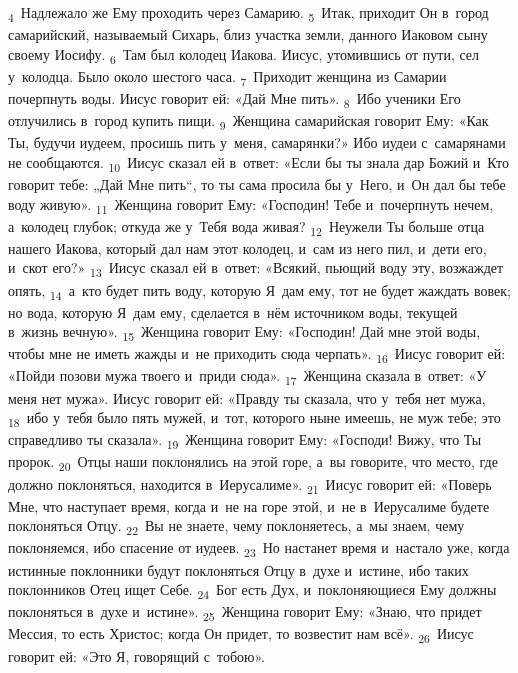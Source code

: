 \documentclass[a4paper,12pt]{article}
\begin{document}
\textsubscript{4}~Надлежало же Ему проходить через Самарию.
\textsubscript{5}~Итак, приходит Он в~город самарийский, называемый Сихарь, близ участка земли, данного Иаковом сыну своему Иосифу.
\textsubscript{6}~Там был колодец Иакова. Иисус, утомившись от пути, сел у~колодца. Было около шестого часа.
\textsubscript{7}~Приходит женщина из Самарии почерпнуть воды. Иисус говорит ей: «Дай Мне пить».
\textsubscript{8}~Ибо ученики Его отлучились в~город купить пищи.
\textsubscript{9}~Женщина самарийская говорит Ему: «Как Ты, будучи иудеем, просишь пить у~меня, самарянки?» Ибо иудеи с~самарянами не сообщаются.
\textsubscript{10}~Иисус сказал ей в~ответ: «Если бы ты знала дар Божий и~Кто говорит тебе: „Дай Мне пить“, то ты сама просила бы у~Него, и~Он дал бы тебе воду живую».
\textsubscript{11}~Женщина говорит Ему: «Господин! Тебе и~почерпнуть нечем, а~колодец глубок; откуда же у~Тебя вода живая?
\textsubscript{12}~Неужели Ты больше отца нашего Иакова, который дал нам этот колодец, и~сам из него пил, и~дети его, и~скот его?»
\textsubscript{13}~Иисус сказал ей в~ответ: «Всякий, пьющий воду эту, возжаждет опять,
\textsubscript{14}~а~кто будет пить воду, которую Я~дам ему, тот не будет жаждать вовек; но вода, которую Я~дам ему, сделается в~нём источником воды, текущей в~жизнь вечную».
\textsubscript{15}~Женщина говорит Ему: «Господин! Дай мне этой воды, чтобы мне не иметь жажды и~не приходить сюда черпать».
\textsubscript{16}~Иисус говорит ей: «Пойди позови мужа твоего и~приди сюда».
\textsubscript{17}~Женщина сказала в~ответ: «У меня нет мужа». Иисус говорит ей: «Правду ты сказала, что у~тебя нет мужа,
\textsubscript{18}~ибо у~тебя было пять мужей, и~тот, которого ныне имеешь, не муж тебе; это справедливо ты сказала».
\textsubscript{19}~Женщина говорит Ему: «Господи! Вижу, что Ты пророк.
\textsubscript{20}~Отцы наши поклонялись на этой горе, а~вы говорите, что место, где должно поклоняться, находится в~Иерусалиме».
\textsubscript{21}~Иисус говорит ей: «Поверь Мне, что наступает время, когда и~не на горе этой, и~не в~Иерусалиме будете поклоняться Отцу.
\textsubscript{22}~Вы не знаете, чему поклоняетесь, а~мы знаем, чему поклоняемся, ибо спасение от иудеев.
\textsubscript{23}~Но настанет время и~настало уже, когда истинные поклонники будут поклоняться Отцу в~духе и~истине, ибо таких поклонников Отец ищет Себе.
\textsubscript{24}~Бог есть Дух, и~поклоняющиеся Ему должны поклоняться в~духе и~истине».
\textsubscript{25}~Женщина говорит Ему: «Знаю, что придет Мессия, то есть Христос; когда Он придет, то возвестит нам всё».
\textsubscript{26}~Иисус говорит ей: «Это Я, говорящий с~тобою».
\end{document}
